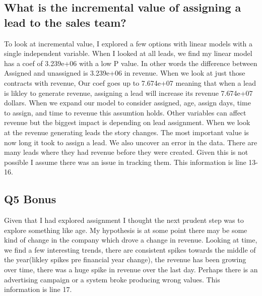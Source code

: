 \documentclass[11pt]{article}
\begin{document}
\subsection{What is the incremental value of assigning a lead to the sales team?}
To look at incremental value, I explored a few options with linear models with a single independent variable. When I looked at all leads, we find my linear model has a coef of 3.239e+06 with a low P value. In other words the difference between Assigned and unassigned is 3.239e+06 in revenue. When we look at just those contracts with revenue,  Our coef goes up to 7.674e+07 meaning that when a lead is likley to generate revenue, assigning a lead will increase its revenue 7.674e+07 dollars. When we expand our model to consider assigned, age, assign days,  time to assign, and time to revenue this assumtion holds. Other variables can affect revenue but the biggest impact is depending on lead assignment. When we look at the revenue generating leads the story changes. The most important value is now long it took to assign a lead. We also uncover an error in the data. There are many leads where they had revenue before they were created. Given this is not possible I assume there was an issue in tracking them. This information is line 13-16.
\subsection{Q5 Bonus}
Given that I had explored assignment I thought the next prudent step was to explore something like age. My hypothesis is at some point there may be some kind of change in the company which drove a change in revenue. Looking at time, we find a few interesting trends, there are consistent spikes towards the middle of the year(likley spikes pre financial year change), the revenue has been growing over time, there was a huge spike in revenue over the last day. Perhaps there is an advertising campaign or a system broke producing wrong values. This information is line 17.
\end{document}
